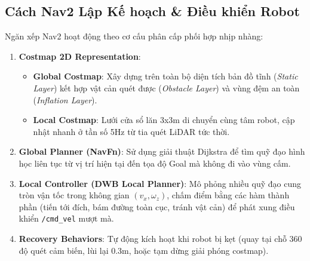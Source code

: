 \documentclass[12pt, a4paper]{article}
\begin{document}
\clearpage
\subsection{Cách Nav2 Lập Kế hoạch \& Điều khiển Robot}
Ngăn xếp Nav2 hoạt động theo cơ cấu phân cấp phối hợp nhịp nhàng:
\begin{enumerate}
    \item \textbf{Costmap 2D Representation}:
    \begin{itemize}
        \item \textbf{Global Costmap}: Xây dựng trên toàn bộ diện tích bản đồ tĩnh (\textit{Static Layer}) kết hợp vật cản quét được (\textit{Obstacle Layer}) và vùng đệm an toàn (\textit{Inflation Layer}).
        \item \textbf{Local Costmap}: Lưới cửa sổ lăn 3x3m di chuyển cùng tâm robot, cập nhật nhanh ở tần số 5Hz từ tia quét LiDAR tức thời.
    \end{itemize}
    \item \textbf{Global Planner (NavFn)}: Sử dụng giải thuật Dijkstra để tìm quỹ đạo hình học liên tục từ vị trí hiện tại đến tọa độ Goal mà không đi vào vùng cấm.
    \item \textbf{Local Controller (DWB Local Planner)}: Mô phỏng nhiều quỹ đạo cung tròn vận tốc trong không gian $(v_x, \omega_z)$, chấm điểm bằng các hàm thành phần (tiến tới đích, bám đường toàn cục, tránh vật cản) để phát xung điều khiển \texttt{/cmd\_vel} mượt mà.
    \item \textbf{Recovery Behaviors}: Tự động kích hoạt khi robot bị kẹt (quay tại chỗ 360 độ quét cảm biến, lùi lại 0.3m, hoặc tạm dừng giải phóng costmap).
\end{enumerate}
\end{document}
